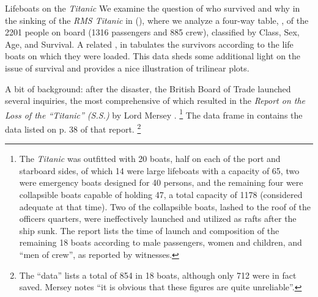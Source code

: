 \documentclass[11pt]{book}
\begin{document}
\begin{Example}[lifeboat1]{Lifeboats on the \emph{Titanic}}
We examine the question of who survived and why in the sinking of the \emph{RMS Titanic} in  (),
where we analyze a four-way table, ,
of the 2201 people on board (1316 passengers and 885 crew),
classified by Class, Sex, Age, and Survival.
A related \Dset,  in  tabulates
the survivors according to the life boats on which they were loaded.
This data sheds some additional light on the issue of survival and
provides a nice illustration of trilinear plots.

A bit of background: after the disaster, the British Board of Trade launched several
inquiries, the most comprehensive of which resulted in the
\emph{Report on the Loss of the ``Titanic'' (S.S.)}
by Lord Mersey
\citep{Mersey:1912}.
\footnote{
The \emph{Titanic} was outfitted with 20 boats, half on each of the
port and starboard sides,
 of which 14 were large
lifeboats with a capacity of 65, two were emergency boats designed for
40 persons, and the remaining four were collapsible boats capable of holding
47, a total capacity of 1178 (considered adequate at that time).
Two of the collapsible boats, lashed to the roof of the officers
quarters, were ineffectively launched and utilized as rafts after the ship sunk.
The report lists the time of launch and composition of the remaining 18 boats according to male passengers, women and children, and ``men of crew'',
as reported by witnesses.
}
The  data frame   in 
contains the data listed on p. 38 of that report.%
\footnote{The ``data'' lists a total of 854 in 18 boats, although only
712 were in fact saved.  Mersey notes ``it is obvious that these figures
are quite unreliable''.  
}


\end{Example}
\end{document}
